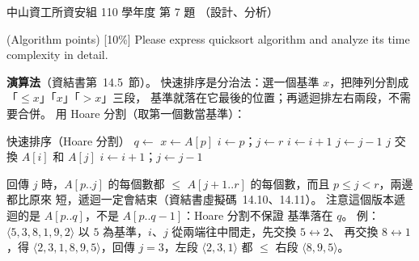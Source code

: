 \begin{pastexam}[label={px:nsysu-110-dmalg-03}]{中山資工所資安組 110 學年度 第 7 題}
（設計、分析）

(Algorithm points) {[10\%]} Please express quicksort algorithm and analyze its time complexity in
detail.
\end{pastexam}

\begin{pastsoln}
\textbf{演算法}（資結書第~14.5~節）。 快速排序是分治法：選一個基準 $x$，把陣列分割成「$\le x$」「$x$」「$> x$」三段，
基準就落在它最後的位置；再遞迴排左右兩段，不需要合併。 用 Hoare 分割（取第一個數當基準）：
\begin{pseudo}{快速排序（Hoare 分割）}
        \State $q \gets$ 
        \State {}
        \State {}
    \EndIf
\EndProcedure
{}
    \State $x \gets A[p]$ 
    \State $i \gets p$；$j \gets r$
    \While{\TRUE}
            \State $i \gets i + 1$
        \EndWhile
            \State $j \gets j - 1$
        \EndWhile
            \State \Return $j$
        \EndIf
        \State 交換 $A[i]$ 和 $A[j]$
        \State $i \gets i + 1$；$j \gets j - 1$
    \EndWhile
\EndFunction
\end{pseudo}
 回傳 $j$ 時，$A[p..j]$ 的每個數都 $\le$ $A[j+1..r]$ 的每個數，而且 $p \le j < r$，兩邊都比原來
短，遞迴一定會結束（資結書虛擬碼~14.10、14.11）。 注意這個版本遞迴的是 $A[p..q]$，不是 $A[p..q-1]$：Hoare 分割不保證
基準落在 $q$。 例：$\langle 5, 3, 8, 1, 9, 2\rangle$ 以 $5$ 為基準，$i$、$j$ 從兩端往中間走，先交換 $5 \leftrightarrow 2$、
再交換 $8 \leftrightarrow 1$，得 $\langle 2, 3, 1, 8, 9, 5\rangle$，回傳 $j = 3$，左段 $\langle 2, 3, 1\rangle$ 都 $\le$ 右段
$\langle 8, 9, 5\rangle$。


\end{pastsoln}
